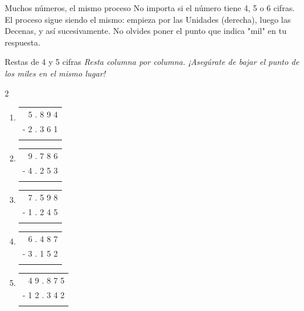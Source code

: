 \documentclass[12pt, letterpaper]{article}
\newcommand{\boxfill}[1][1.2cm]{\tcbox[on line, size=minimal, colframe=valdark!80, colback=white, boxrule=0.5pt, arc=1mm, boxsep=2pt, left=2pt, right=2pt, top=2pt, bottom=2pt]{\makebox[#1]{\vphantom{M}}}}
\begin{document}
	\begin{concepto}{Muchos números, el mismo proceso}
		No importa si el número tiene 4, 5 o 6 cifras. El proceso sigue siendo el mismo: empieza por las Unidades (derecha), luego las Decenas, y así sucesivamente. No olvides poner el punto que indica "mil" en tu respuesta.
	\end{concepto}
	\newpage
	\begin{practica}{Restas de 4 y 5 cifras }
		\textit{Resta columna por columna. ¡Asegúrate de bajar el punto de los miles en el mismo lugar!}
		
		\vspace{0.4cm}
		\begin{multicols}{2}
			\raggedcolumns
			\begin{enumerate}[itemsep=1cm]
				\item 
				\begin{tabular}{r}
					5 . 8 9 4 \\
					- 2 . 3 6 1 \\
					\hline
					\boxfill[1.8cm]
				\end{tabular}
				
				\item 
				\begin{tabular}{r}
					9 . 7 8 6 \\
					- 4 . 2 5 3 \\
					\hline
					\boxfill[1.8cm]
				\end{tabular}
				
				\item 
				\begin{tabular}{r}
					7 . 5 9 8 \\
					- 1 . 2 4 5 \\
					\hline
					\boxfill[1.8cm]
				\end{tabular}
				
				\item 
				\begin{tabular}{r}
					6 . 4 8 7 \\
					- 3 . 1 5 2 \\
					\hline
					\boxfill[1.8cm]
				\end{tabular}
				
				\item 
				\begin{tabular}{r}
					4 9 . 8 7 5 \\
					- 1 2 . 3 4 2 \\
					\hline
					\boxfill[2.2cm]
				\end{tabular}
				

\end{enumerate}
\end{multicols}
\end{practica}
\end{document}

